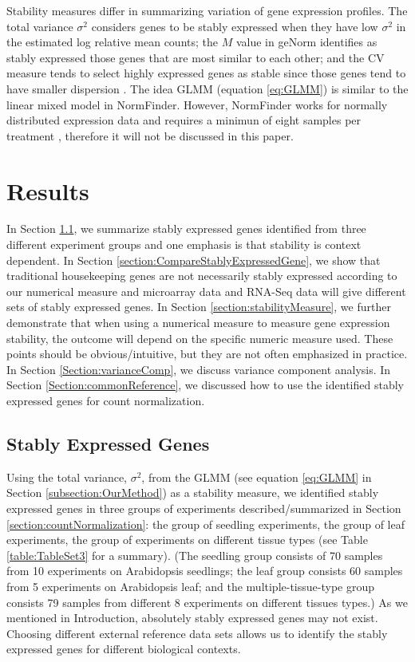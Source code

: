 \documentclass[11pt, a4paper]{article}
\begin{document}
Stability measures differ in summarizing variation of gene expression profiles. The total variance ${\sigma}^2$ considers genes to be stably expressed when they have low ${\sigma}^2$ in the estimated log relative mean
counts; the $M$ value in geNorm identifies as stably
expressed those genes that are most similar to each other; and the CV measure
\citep{czechowski2005genome} tends to select highly expressed genes as stable
since those genes tend to have smaller dispersion \citep{hruz2011refgenes}. The idea GLMM (equation \ref{eq:GLMM}) is similar to the linear mixed model in NormFinder. However, NormFinder works for normally distributed expression data and requires a minimun of eight samples per treatment \citep{andersen2004normalization}, therefore it will not be discussed in this paper. %



\section{Results} \label{section:Results}
In Section \ref{section:stablyExpressedGene}, we summarize stably expressed genes identified from three
different experiment groups and one emphasis is that stability is
context dependent. In Section \ref{section:CompareStablyExpressedGene}, we show that traditional housekeeping
genes are not necessarily stably expressed according to our numerical measure
and microarray data and RNA-Seq data will give different sets of stably
expressed genes.  In Section \ref{section:stabilityMeasure}, we further demonstrate that when using a
numerical measure to measure gene expression stability, the outcome will
depend on the specific numeric measure used.  These points should be
obvious/intuitive, but they are not often emphasized in practice. 
In Section \ref{Section:varianceComp}, we discuss variance component analysis. In Section
\ref{Section:commonReference}, we discussed how to use the identified stably expressed genes for count
normalization.

\subsection{Stably Expressed Genes}\label{section:stablyExpressedGene}
Using the total variance, $\sigma^2$, from the GLMM (see
equation \ref{eq:GLMM} in Section \ref{subsection:OurMethod}) as a
stability measure, we identified stably expressed genes in three groups of
experiments described/summarized in Section \ref{section:countNormalization}: the group of seedling
experiments, the group of leaf experiments, the group of experiments on
different tissue types (see Table \ref{table:TableSet3} for a summary).  (The
seedling group consists of 70 samples from 10 experiments on Arabidopsis
seedlings; the leaf group consists 60 samples from 5 experiments on
Arabidopsis leaf; and the multiple-tissue-type group consists 79 samples from
different 8 experiments on different tissues types.) As we mentioned in
Introduction, absolutely stably expressed genes may not exist.  Choosing
different external reference data sets allows us to identify the stably
expressed genes for different biological contexts.
\end{document}
